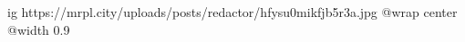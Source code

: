  
 
 
 
 

\ifcmt
  ig https://mrpl.city/uploads/posts/redactor/hfysu0mikfjb5r3a.jpg
  @wrap center
  @width 0.9
\fi
